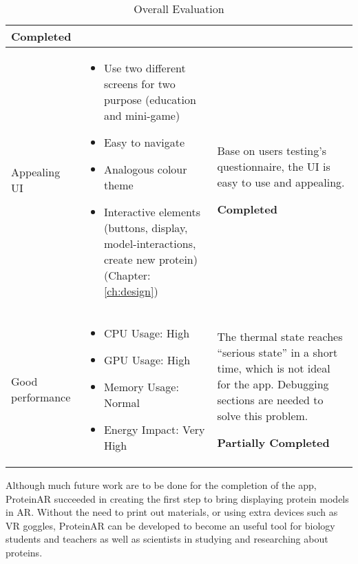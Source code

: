 \begin{table}[!h]
\begin{tabular}{| m{} | m{} | m{}|}
 \textbf{Completed}\\
 \hline
 
  Appealing UI &
 \begin{itemize}
 	\item Use two different screens for two purpose (education and mini-game)
	\item Easy to navigate
	\item Analogous colour theme
	\item Interactive elements (buttons, display, model-interactions, create new protein) (Chapter: \ref{ch:design})
\end{itemize} &
Base on users testing's questionnaire, the UI is easy to use and appealing.

\textbf{Completed}\\
\hline

Good performance&
 \begin{itemize} 
	 \item CPU Usage: High
	 \item GPU Usage: High
	 \item Memory Usage: Normal
	  \item Energy Impact: Very High
\end{itemize} &
The thermal state reaches “serious state” in a short time, which is not ideal for the app. Debugging sections are needed to solve this problem.

\textbf{Partially Completed}\\
\hline
\end{tabular}
\caption{Overall Evaluation}
\label{tab:evaluation}
\end{table}
Although much future work are to be done for the completion of the app, ProteinAR succeeded in creating the first step to bring displaying protein models in AR. Without the need to print out materials, or using extra devices such as VR goggles, ProteinAR can be developed to become an useful tool for biology students and teachers as well as scientists in studying and researching about proteins.


